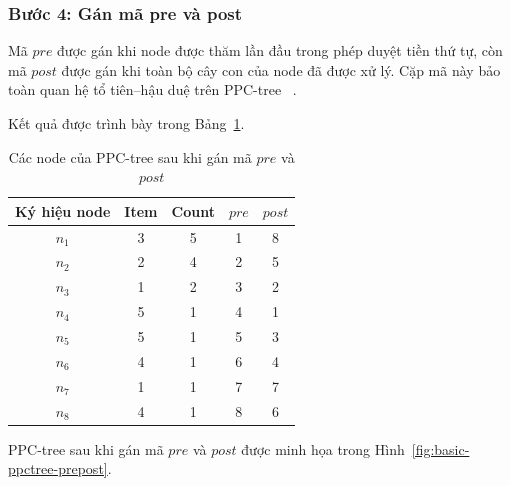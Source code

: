 \subsubsection{Bước 4: Gán mã pre và post}

Mã $pre$ được gán khi node được thăm lần đầu trong phép duyệt tiền thứ tự,
còn mã $post$ được gán khi toàn bộ cây con của node đã được xử lý. Cặp mã này
bảo toàn quan hệ tổ tiên--hậu duệ trên PPC-tree
~\cite{deng2012prepost}.

Kết quả được trình bày trong Bảng~\ref{tab:basic-prepost-codes}.

\begin{table}[H]
\centering
\caption{Các node của PPC-tree sau khi gán mã $pre$ và $post$}
\label{tab:basic-prepost-codes}
\begin{tabular}{ccccc}
\toprule
Ký hiệu node & Item & Count & $pre$ & $post$ \\
\midrule
$n_1$ & 3 & 5 & 1 & 8 \\
$n_2$ & 2 & 4 & 2 & 5 \\
$n_3$ & 1 & 2 & 3 & 2 \\
$n_4$ & 5 & 1 & 4 & 1 \\
$n_5$ & 5 & 1 & 5 & 3 \\
$n_6$ & 4 & 1 & 6 & 4 \\
$n_7$ & 1 & 1 & 7 & 7 \\
$n_8$ & 4 & 1 & 8 & 6 \\
\bottomrule
\end{tabular}
\end{table}

PPC-tree sau khi gán mã $pre$ và $post$ được minh họa trong Hình~\ref{fig:basic-ppctree-prepost}.

